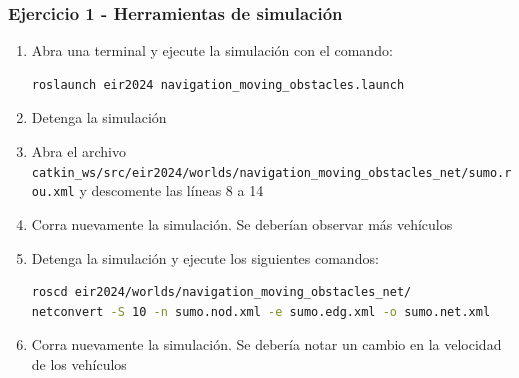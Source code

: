 \begin{frame}[containsverbatim]\frametitle{Ejercicio 1 - Herramientas de simulación}
  \begin{enumerate}
  \item Abra una terminal y ejecute la simulación con el comando:
    \begin{lstlisting}[language=bash,numbers=none]
roslaunch eir2024 navigation_moving_obstacles.launch
    \end{lstlisting}
  \item Detenga la simulación
  \item Abra el archivo \texttt{catkin\_ws/src/eir2024/worlds/navigation\_moving\_obstacles\_net/sumo.rou.xml} y descomente las líneas 8 a 14
  \item Corra nuevamente la simulación. Se deberían observar más vehículos
  \item Detenga la simulación y ejecute los siguientes comandos:
    \begin{lstlisting}[language=bash,numbers=none]
roscd eir2024/worlds/navigation_moving_obstacles_net/
netconvert -S 10 -n sumo.nod.xml -e sumo.edg.xml -o sumo.net.xml
    \end{lstlisting}
  \item Corra nuevamente la simulación. Se debería notar un cambio en la velocidad de los vehículos
  \end{enumerate}
\end{frame}
